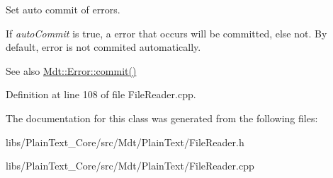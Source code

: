Set auto commit of errors. 

If {\itshape auto\+Commit} is true, a error that occurs will be committed, else not. By default, error is not commited automatically.

\begin{DoxySeeAlso}{See also}
\hyperlink{class_mdt_1_1_error_a1b4a57bd4177d2985abd62b6b49a43f8}{Mdt\+::\+Error\+::commit()} 
\end{DoxySeeAlso}


Definition at line 108 of file File\+Reader.\+cpp.



The documentation for this class was generated from the following files\+:\begin{DoxyCompactItemize}
\item 
libs/\+Plain\+Text\+\_\+\+Core/src/\+Mdt/\+Plain\+Text/File\+Reader.\+h\item 
libs/\+Plain\+Text\+\_\+\+Core/src/\+Mdt/\+Plain\+Text/File\+Reader.\+cpp\end{DoxyCompactItemize}
